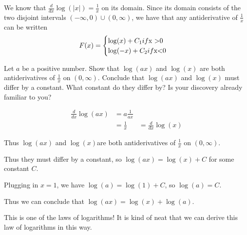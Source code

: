\documentclass{ximera}
\begin{document}
	\begin{example}
		We know that $\frac{d}{dx} \log( |x |) =  \frac{1}{x}$ on its domain.   Since its domain consists of the two disjoint intervals $(-\infty,0) \cup (0,\infty)$, we have that any antiderivative of $\frac{1}{x}$ can be written 
		\[
		F(x) = \begin{cases}
			\log(x)+C_1 if $x >0$\\
			\log(-x)+C_2 if $x<0$
		\end{cases}
		\]
	\end{example}
	
	\begin{question}
		Let $a$ be a positive number.  Show that $\log(ax)$ and $\log(x)$ are both antiderivatives of $\frac{1}{x}$ on $(0,\infty)$.  Conclude that $\log(ax)$ and $\log(x)$ must differ by a constant.  What constant do they differ by?  Is your discovery already familiar to you?
		
		\begin{free-response}
			\begin{align*}
				\frac{d}{dx} \log(ax) &= a\frac{1}{ax}\\
				&=\frac{1}{x}
				&=\frac{d}{dx} \log(x)
			\end{align*}
			
			Thus $\log(ax)$ and $\log(x)$are both antiderivatives of $\frac{1}{x}$ on $(0,\infty)$.
			
			Thus they must differ by a constant, so $\log(ax) = \log(x)+C$ for some constant $C$.
			
			Plugging in $x=1$, we have $\log(a) = \log(1)+C$, so $\log(a) = C$.
			
			Thus we can conclude that $\log(ax) = \log(x)+\log(a)$.
			
			This is one of the laws of logarithms!  It is kind of neat that we can derive this law of logarithms in this way.
			
		\end{free-response}
	\end{question}
	
\end{document}
